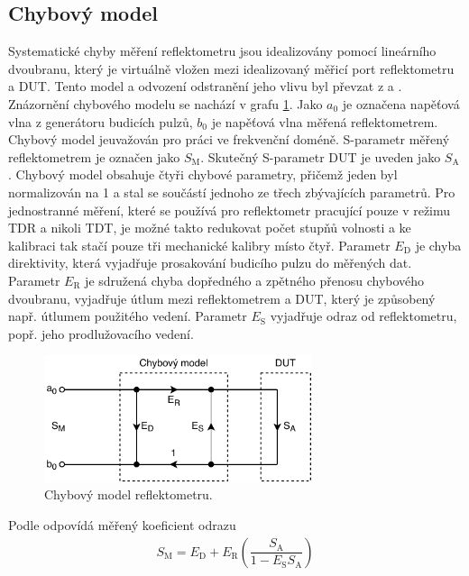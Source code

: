 \subsection{Chybový model}
Systematické chyby měření reflektometru jsou idealizovány pomocí lineárního dvoubranu, který je virtuálně vložen mezi idealizovaný měřicí port reflektometru a \acrshort{DUT}. Tento model a odvození odstranění jeho vlivu byl převzat z \cite{time_domain_analyzer_calibration} a \cite{time_domain_analyzer_calibration_normalization}. Znázornění chybového modelu se nachází v grafu \ref{error_model}. Jako $a_0$ je označena napěťová vlna z generátoru budicích pulzů, $b_0$ je napěťová vlna měřená reflektometrem. Chybový model jeuvažován pro práci ve frekvenční doméně. S-parametr měřený reflektometrem je označen jako $S_\mathrm{M}$. Skutečný S-parametr DUT je uveden jako $S_\mathrm{A}$. Chybový model obsahuje čtyři chybové parametry, přičemž jeden byl normalizován na 1 a stal se součástí jednoho ze třech zbývajících parametrů. Pro jednostranné měření, které se používá pro reflektometr pracující pouze v režimu TDR a nikoli \acrshort{TDT}, je možné takto redukovat počet stupňů volnosti a ke kalibraci tak stačí pouze tři mechanické kalibry místo čtyř. Parametr $E_\textrm{D}$ je chyba direktivity, která vyjadřuje prosakování budicího pulzu do měřených dat. Parametr $E_\textrm{R}$ je sdružená chyba dopředného a zpětného přenosu chybového dvoubranu, vyjadřuje útlum mezi reflektometrem a DUT, který je způsobený např. útlumem použitého vedení. Parametr $E_\textrm{S}$ vyjadřuje odraz od reflektometru, popř. jeho prodlužovacího vedení.
\begin{figure}[htbp]
\includegraphics[width=0.7\textwidth,keepaspectratio]{images/error_box.pdf}\caption{Chybový model reflektometru.}\label{error_model}
\end{figure}

Podle \cite{time_domain_analyzer_calibration_normalization} odpovídá měřený koeficient odrazu
\begin{equation}
\begin{gathered}
	S_\mathrm{M} = E_\textrm{D} + E_\textrm{R} \left( \dfrac{S_\mathrm{A}}{1-E_\mathrm{S} S_\mathrm{A}} \right) 
\end{gathered}
\end{equation}

